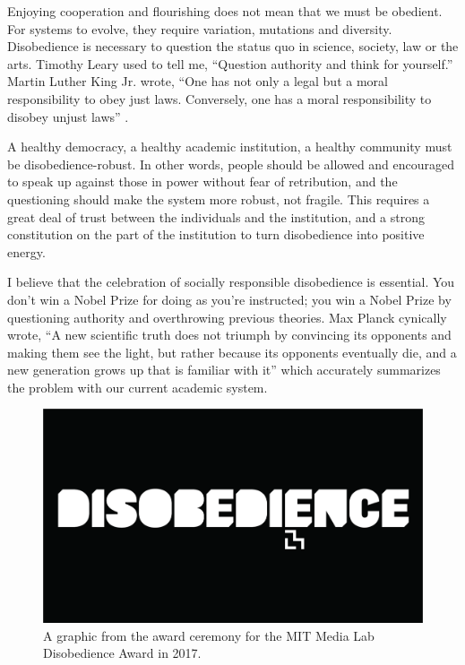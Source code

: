 Enjoying cooperation and flourishing does not mean that we must be obedient. For systems to evolve, they require variation, mutations and diversity. Disobedience is necessary to question the status quo in science, society, law or the arts. Timothy Leary used to tell me, ``Question authority and think for yourself.'' Martin Luther King Jr. wrote, “One has not only a legal but a moral responsibility to obey just laws. Conversely, one has a moral responsibility to disobey unjust laws'' \cite{king2012letter}.

A healthy democracy, a healthy academic institution, a healthy community must be disobedience-robust. In other words, people should be allowed and encouraged to speak up against those in power without fear of retribution, and the questioning should make the system more robust, not fragile. This requires a great deal of trust between the individuals and the institution, and a strong constitution on the part of the institution to turn disobedience into positive energy.

I believe that the celebration of socially responsible disobedience is essential. You don't win a Nobel Prize for doing as you're instructed; you win a Nobel Prize by questioning authority and overthrowing previous theories. Max Planck cynically wrote, ``A new scientific truth does not triumph by convincing its opponents and making them see the light, but rather because its opponents eventually die, and a new generation grows up that is familiar with it'' \cite{planck2014scientific} which accurately summarizes the problem with our current academic system.

\begin{figure}[t]
 \centering
 \includegraphics[width=1\textwidth]{pictures/disobedience}
 \caption{A graphic from the award ceremony for the MIT Media Lab Disobedience Award in 2017.}
 \label{fig:disobedience}
\end{figure}

